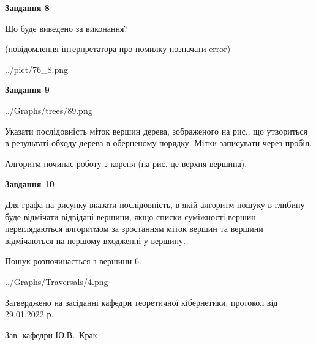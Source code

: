 \documentclass[12pt, ukrainian]{article}
\begin{document}
{\begin {large}
{\begin {center}\textbf{Завдання 8}\end {center}}\par
Що буде виведено за виконання?\par
 (повідомлення інтерпретатора про помилку позначати error)\par
\begin{center}
	{../pict/76_8.png}
\end{center}
\newpage

{\begin {center}\textbf{Завдання 9}\end {center}}\par

\begin{center}
	{../Graphs/trees/89.png}
\end{center}
Указати послідовність міток вершин дерева, зображеного на рис., що утвориться в результаті обходу дерева в оберненому порядку. Мітки записувати через пробіл.\par Алгоритм починає роботу з кореня (на рис. це верхня вершина).\par
\newpage

{\begin {center}\textbf{Завдання 10}\end {center}}\par
Для графа на рисунку вказати послідовність, в якій алгоритм пошуку в глибину буде відмічати відвідані вершини, якщо списки суміжності вершин переглядаються алгоритмом за зростанням міток вершин та вершини відмічаються на першому вход\-женні у вершину.\par
Пошук розпочинається з вершини 6.\par

\begin{center}
	{../Graphs/Traversals/4.png}
\end{center}\par
\newpage


\end {large}
}
{\smallskip \begin {small} Затверджено на засіданні кафедри теоретичної кібернетики, протокол  від   29.01.2022 р.\par\smallskip\smallskip
{\parbox {6.5 cm}{Зав. кафедри \dotfill Ю.В.~Крак}} \end{small}}
\end{document}
